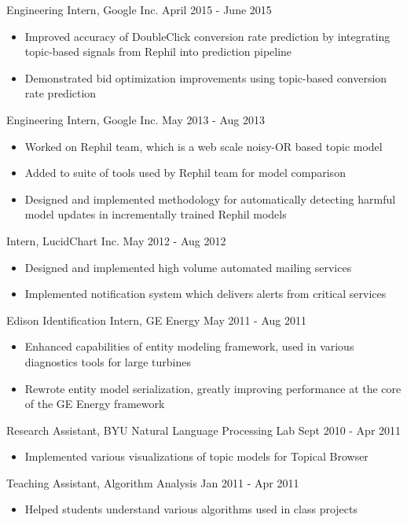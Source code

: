 \documentclass[margin]{res}
\begin{document}
\begin{resume}
Engineering Intern, Google Inc. \hfill April 2015 - June 2015
\begin{itemize} \itemsep -2pt
\item Improved accuracy of DoubleClick conversion rate prediction by integrating topic-based signals from Rephil into prediction pipeline
\item Demonstrated bid optimization improvements using topic-based conversion rate prediction
\end{itemize}

Engineering Intern, Google Inc. \hfill May 2013 - Aug 2013
\begin{itemize} \itemsep -2pt
\item Worked on Rephil team, which is a web scale noisy-OR based topic model
\item Added to suite of tools used by Rephil team for model comparison
\item Designed and implemented methodology for automatically detecting harmful model updates in incrementally trained Rephil models
\end{itemize}

Intern, LucidChart Inc. \hfill May 2012 - Aug 2012
\begin{itemize} \itemsep -2pt
\item Designed and implemented high volume automated mailing services
\item Implemented notification system which delivers alerts from critical services
\end{itemize}

Edison Identification Intern, GE Energy \hfill May 2011 - Aug 2011
\begin{itemize} \itemsep -2pt
\item Enhanced capabilities of entity modeling framework, used in various diagnostics tools for large turbines
\item Rewrote entity model serialization, greatly improving performance at the core of the GE Energy framework
\end{itemize}

Research Assistant, BYU Natural Language Processing Lab \hfill Sept 2010 - Apr
2011
\begin{itemize} \itemsep -2pt
\item Implemented various visualizations of topic models for Topical Browser
\end{itemize}

Teaching Assistant, Algorithm Analysis \hfill Jan 2011 - Apr 2011
\begin{itemize} \itemsep -2pt
\item Helped students understand various algorithms used in class projects
\end{itemize}


\end{resume}
\end{document}
